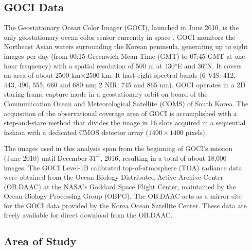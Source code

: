 \documentclass[onecolumn,3p,letterpaper,11pt]{elsarticle}
\begin{document}
\subsection{GOCI Data}
The Geostationary Ocean Color Imager (GOCI), launched in June 2010, is the only geostationary ocean color sensor currently in space \citep{Ryu2012}. GOCI monitors the Northeast Asian waters surrounding the Korean peninsula, generating up to eight images per day (from 00:15 Greenwich Mean Time (GMT) to 07:45 GMT at one hour frequency) with a spatial resolution of 500 m at 130$^o$E and 36$^o$N. It covers an area of about 2500 km$\times$2500 km. It hast eight spectral bands (6 VIS: 412, 443, 490, 555, 660 and 680 nm; 2 NIR: 745 and 865 nm). GOCI operates in a 2D staring-frame capture mode in a geostationary orbit on board of the Communication Ocean and Meteorological Satellite (COMS) of South Korea. The acquisition of the observational coverage area of GOCI is accomplished with a step-and-stare method that divides the image in 16 slots acquired in a sequential fashion with a dedicated CMOS detector array ($1400\times1400$ pixels).

The images used in this analysis span from the beginning of GOCI's mission (June 2010) until December $31^{st}$, 2016, resulting in a total of about 18,000 images. The GOCI Level-1B calibrated top-of-atmosphere (TOA) radiance data were obtained from the Ocean Biology Distributed Active Archive Center (OB.DAAC) at the NASA's Goddard Space Flight Center, maintained by the Ocean Biology Processing Group (OBPG). The OB.DAAC acts as a mirror site for the GOCI data provided by the Korea Ocean Satellite Center. These data are freely available for direct download from the OB.DAAC. 
\subsection{Area of Study}
\end{document}
